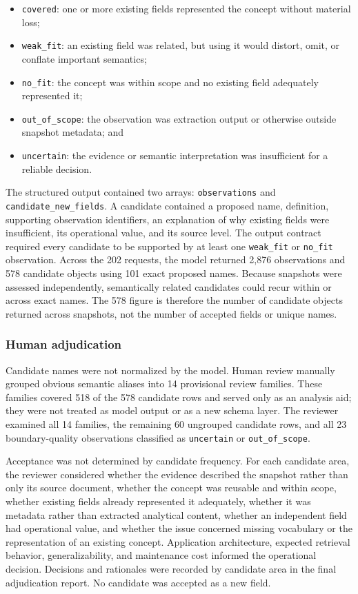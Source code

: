 \documentclass{article}
\begin{document}
\begin{itemize}
    \item \texttt{covered}: one or more existing fields represented the concept without material loss;
    \item \texttt{weak\_fit}: an existing field was related, but using it would distort, omit, or conflate important semantics;
    \item \texttt{no\_fit}: the concept was within scope and no existing field adequately represented it;
    \item \texttt{out\_of\_scope}: the observation was extraction output or otherwise outside snapshot metadata; and
    \item \texttt{uncertain}: the evidence or semantic interpretation was insufficient for a reliable decision.
\end{itemize}

The structured output contained two arrays: \texttt{observations} and \texttt{candidate\_new\_fields}. A candidate contained a proposed name, definition, supporting observation identifiers, an explanation of why existing fields were insufficient, its operational value, and its source level. The output contract required every candidate to be supported by at least one \texttt{weak\_fit} or \texttt{no\_fit} observation. Across the 202 requests, the model returned 2,876 observations and 578 candidate objects using 101 exact proposed names. Because snapshots were assessed independently, semantically related candidates could recur within or across exact names. The 578 figure is therefore the number of candidate objects returned across snapshots, not the number of accepted fields or unique names.

\subsubsection{Human adjudication}

Candidate names were not normalized by the model. Human review manually grouped obvious semantic aliases into 14 provisional review families. These families covered 518 of the 578 candidate rows and served only as an analysis aid; they were not treated as model output or as a new schema layer. The reviewer examined all 14 families, the remaining 60 ungrouped candidate rows, and all 23 boundary-quality observations classified as \texttt{uncertain} or \texttt{out\_of\_scope}.

Acceptance was not determined by candidate frequency. For each candidate area, the reviewer considered whether the evidence described the snapshot rather than only its source document, whether the concept was reusable and within scope, whether existing fields already represented it adequately, whether it was metadata rather than extracted analytical content, whether an independent field had operational value, and whether the issue concerned missing vocabulary or the representation of an existing concept. Application architecture, expected retrieval behavior, generalizability, and maintenance cost informed the operational decision. Decisions and rationales were recorded by candidate area in the final adjudication report. No candidate was accepted as a new field.
\end{document}
